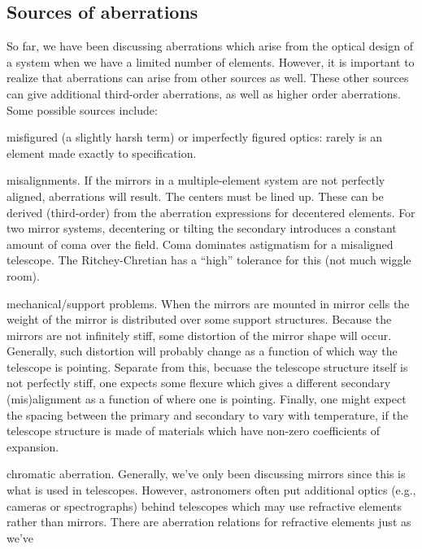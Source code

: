 \documentclass[12pt]{article}
\begin{document}
\subsection*{Sources of aberrations}
So far, we have been discussing aberrations which arise from the
optical design of a system when we have a limited number of elements.
However, it is important to realize that aberrations can arise from
other sources as well. These other sources can give additional
third-order aberrations, as well as higher order aberrations. Some
possible sources include:
\begin{itemize*}
    \item misfigured (a slightly harsh term)
        or imperfectly figured optics: rarely is an element made
        exactly to specification.
    \item misalignments. If the mirrors in a multiple-element system are not
        perfectly aligned, aberrations will result. The centers must be
        lined up.  These can be derived
        (third-order) from the aberration expressions for decentered elements.
        For two mirror systems, decentering or tilting the
        secondary introduces a constant amount of coma over the field. Coma
        dominates astigmatism for a misaligned telescope.
        The Ritchey-Chretian has a ``high'' tolerance for this (not much
        wiggle room).
    \item mechanical/support problems. When the mirrors are mounted in mirror
        cells the weight of the mirror is distributed over some support
        structures. Because the mirrors are not infinitely stiff, some
        distortion of the mirror shape will occur. Generally, such distortion
        will probably change as a function of which way the telescope is
        pointing. Separate from this, becuase the telescope structure itself
        is not perfectly stiff, one expects some flexure which gives a
        different secondary (mis)alignment as a function of where one is
        pointing. Finally, one might expect the spacing between the primary
        and secondary to vary with temperature, if the telescope structure is
        made of materials which have non-zero coefficients of expansion.
    \item chromatic aberration. Generally, we've only been discussing mirrors
        since this is what is used in telescopes. However, astronomers often
        put additional optics (e.g., cameras or spectrographs) behind
        telescopes which may use refractive elements rather than mirrors.
        There are aberration relations for refractive elements just as we've

\end{itemize*}
\end{document}
